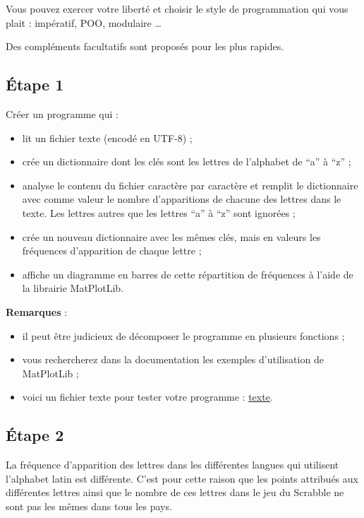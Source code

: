 \documentclass[
  a4paper,
  DIV=11,
  numbers=noendperiod]{scrartcl}
\providecommand{\tightlist}{%
  \setlength{\itemsep}{0pt}\setlength{\parskip}{0pt}}\usepackage{longtable,booktabs,array}
\begin{document}
Vous pouvez exercer votre liberté et choisir le style de programmation
qui vous plait : impératif, POO, modulaire \ldots{}

Des compléments facultatifs sont proposés pour les plus rapides.

\hypertarget{uxe9tape-1}{%
\subsection{Étape 1}\label{uxe9tape-1}}

Créer un programme qui :

\begin{itemize}
\tightlist
\item
  lit un fichier texte (encodé en UTF-8) ;
\item
  crée un dictionnaire dont les clés sont les lettres de l'alphabet de
  ``a'' à ``z'' ;
\item
  analyse le contenu du fichier caractère par caractère et remplit le
  dictionnaire avec comme valeur le nombre d'apparitions de chacune des
  lettres dans le texte. Les lettres autres que les lettres ``a'' à
  ``z'' sont ignorées ;
\item
  crée un nouveau dictionnaire avec les mêmes clés, mais en valeurs les
  fréquences d'apparition de chaque lettre ;
\item
  affiche un diagramme en barres de cette répartition de fréquences à
  l'aide de la librairie MatPlotLib.
\end{itemize}

\textbf{Remarques} :

\begin{itemize}
\tightlist
\item
  il peut être judicieux de décomposer le programme en plusieurs
  fonctions ;
\item
  vous rechercherez dans la documentation les exemples d'utilisation de
  MatPlotLib ;
\item
  voici un fichier texte pour tester votre programme :
  \href{texteFR.txt}{texte}.
\end{itemize}

\hypertarget{uxe9tape-2}{%
\subsection{Étape 2}\label{uxe9tape-2}}

La fréquence d'apparition des lettres dans les différentes langues qui
utilisent l'alphabet latin est différente. C'est pour cette raison que
les points attribués aux différentes lettres ainsi que le nombre de ces
lettres dans le jeu du Scrabble ne sont pas les mêmes dans tous les
pays.
\end{document}
